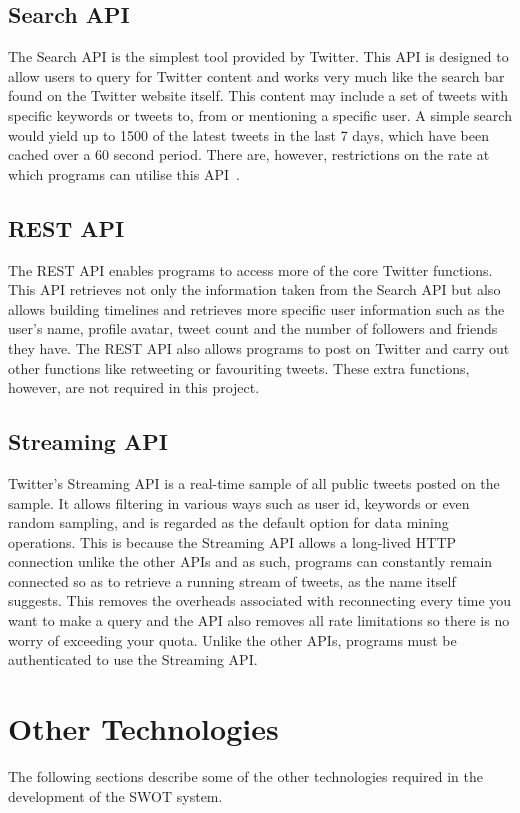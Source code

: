 \subsection{Search API}
The Search API is the simplest tool provided by Twitter. This API is designed to allow users to query for Twitter content and works very much like the search bar found on the Twitter website itself. This content may include a set of tweets with specific keywords or tweets to, from or mentioning a specific user. A simple search would yield up to 1500 of the latest tweets in the last 7 days, which have been cached over a 60 second period. There are, however, restrictions on the rate at which programs can utilise this API~\cite{twitter}.

\subsection{REST API}
The REST API enables programs to access more of the core Twitter functions. This API retrieves not only the information taken from the Search API but also allows building timelines and retrieves more specific user information such as the user's name, profile avatar, tweet count and the number of followers and friends they have. The REST API also allows programs to post on Twitter and carry out other functions like retweeting or favouriting tweets. These extra functions, however, are not required in this project.

\subsection{Streaming API}
Twitter's Streaming API is a real-time sample of all public tweets posted on the sample. It allows filtering in various ways such as user id, keywords or even random sampling, and is regarded as the default option for data mining operations. This is because the Streaming API allows a long-lived HTTP connection unlike the other APIs and as such, programs can constantly remain connected so as to retrieve a running stream of tweets, as the name itself suggests. This removes the overheads associated with reconnecting every time you want to make a query and the API also removes all rate limitations so there is no worry of exceeding your quota. Unlike the other APIs, programs must be authenticated to use the Streaming API.

\section{Other Technologies}
The following sections describe some of the other technologies required in the development of the SWOT system.

